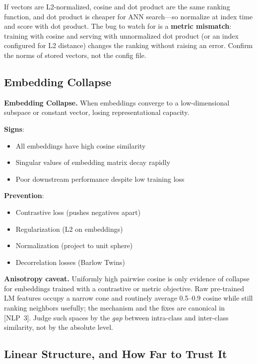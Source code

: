If vectors are L2-normalized, cosine and dot product are the same ranking function, and dot product is cheaper for ANN search---so normalize at index time and score with dot product. The bug to watch for is a \textbf{metric mismatch}: training with cosine and serving with unnormalized dot product (or an index configured for L2 distance) changes the ranking without raising an error. Confirm the norms of stored vectors, not the config file.

\subsection{Embedding Collapse}

\textbf{Embedding Collapse.} When embeddings converge to a low-dimensional subspace or constant vector, losing representational capacity.

\textbf{Signs}:
\begin{itemize}
    \item All embeddings have high cosine similarity
    \item Singular values of embedding matrix decay rapidly
    \item Poor downstream performance despite low training loss
\end{itemize}

\textbf{Prevention}:
\begin{itemize}
    \item Contrastive loss (pushes negatives apart)
    \item Regularization (L2 on embeddings)
    \item Normalization (project to unit sphere)
    \item Decorrelation losses (Barlow Twins)
\end{itemize}

\textbf{Anisotropy caveat.} Uniformly high pairwise cosine is only evidence of collapse for embeddings trained with a contrastive or metric objective. Raw pre-trained LM features occupy a narrow cone and routinely average 0.5--0.9 cosine while still ranking neighbors usefully; the mechanism and the fixes are canonical in [NLP~3]. Judge such spaces by the \emph{gap} between intra-class and inter-class similarity, not by the absolute level.

\subsection{Linear Structure, and How Far to Trust It}

